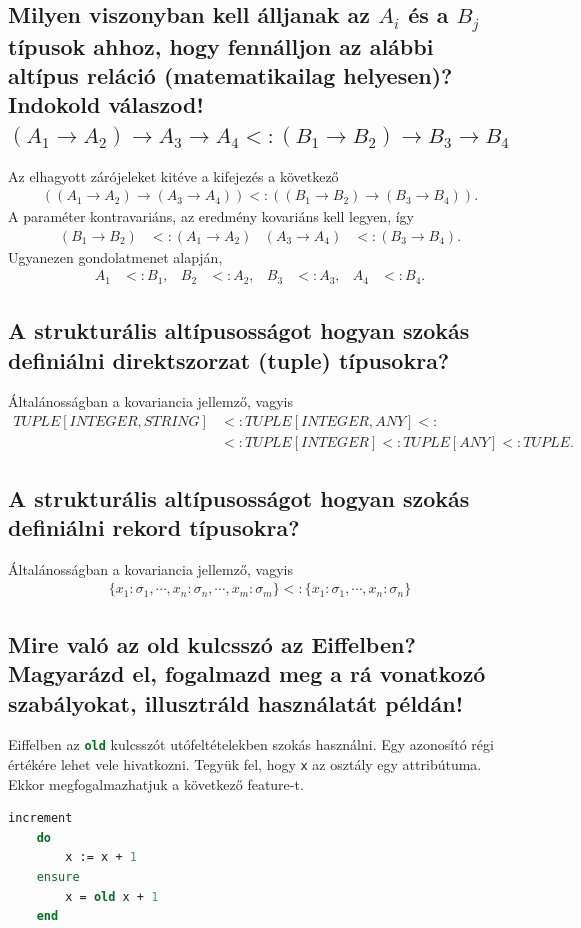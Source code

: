 \subsection{ Milyen viszonyban kell álljanak az $A_i$ és a $B_j$ típusok ahhoz, hogy fennálljon az alábbi altípus reláció (matematikailag helyesen)? Indokold válaszod! $(A_1 \rightarrow A_2) \rightarrow A_3 \rightarrow A_4 <: (B_1 \rightarrow B_2) \rightarrow B_3 \rightarrow B_4$ }

	Az elhagyott zárójeleket kitéve a kifejezés a következő
	\begin{align*}
	((A_1 \rightarrow A_2) \rightarrow (A_3 \rightarrow A_4)) <: ((B_1 \rightarrow B_2) \rightarrow (B_3 \rightarrow B_4)).
	\end{align*}
	A paraméter kontravariáns, az eredmény kovariáns kell legyen, így
	\begin{align*}
	( B_1 \rightarrow B_2 ) &<: ( A_1 \rightarrow A_2) &
	( A_3 \rightarrow A_4 ) &<: ( B_3 \rightarrow B_4).
	\end{align*}
	Ugyanezen gondolatmenet alapján,
	\begin{align*}
	A_1 &<: B_1,& B_2 &<: A_2,& B_3 &<: A_3,& A_4 &<: B_4.
	\end{align*}

\subsection{ A strukturális altípusosságot hogyan szokás definiálni direktszorzat (tuple) típusokra? }
	Általánosságban a kovariancia jellemző, vagyis
	\begin{align*}
	TUPLE[INTEGER,STRING]&<:TUPLE[INTEGER,ANY]<:\\&
	 <:TUPLE[INTEGER]<:TUPLE[ANY]<:TUPLE.
	\end{align*}


\subsection{ A strukturális altípusosságot hogyan szokás definiálni rekord típusokra? }
	Általánosságban a kovariancia jellemző, vagyis
	\begin{align*}
	\{x_1:\sigma_1,\cdots,x_n:\sigma_n,\cdots,x_m:\sigma_m\}<:\{x_1:\sigma_1,\cdots,x_n:\sigma_n\}
	\end{align*}

\subsection{ Mire való az old kulcsszó az Eiffelben? Magyarázd el, fogalmazd meg a rá vonatkozó szabályokat, illusztráld használatát példán! }\label{old}
	Eiffelben az \lstinline[language=Eiffel]|old| kulcsszót utófeltételekben szokás használni. Egy azonosító régi értékére lehet vele hivatkozni. Tegyük fel, hogy \verb|x| az osztály egy attribútuma. Ekkor megfogalmazhatjuk a következő feature-t.
	\begin{lstlisting}[language=Eiffel]
	increment
	do
		x := x + 1
	ensure
		x = old x + 1
	end
	\end{lstlisting}

